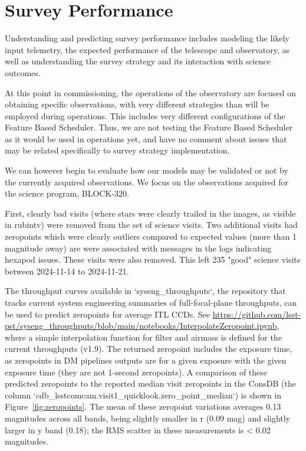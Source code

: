 \section{Survey Performance}
\label{sec:survey_performance}

Understanding and predicting survey performance includes modeling the likely input telemetry, the expected performance of the telescope and observatory, as well as understanding the survey strategy and its interaction with science outcomes. 

At this point in commissioning, the operations of the observatory are focused on obtaining specific observations, with very different strategies than will be employed during operations. This includes very different configurations of the Feature Based Scheduler. Thus, we are not testing the Feature Based Scheduler as it would be used in operations yet, and have no comment about issues that may be related specifically to survey strategy implementation. 

We can however begin to evaluate how our models may be validated or not by the currently acquired observations. We focus on the observations acquired for the science program, BLOCK-320.

First, clearly bad visits (where stars were clearly trailed in the images, as visible in rubintv) were removed from the set of science visits. Two additional visits had zeropoints which were clearly outliers compared to expected values (more than 1 magnitude away) are were associated with messages in the logs indicating hexapod issues. These visits were also removed. This left 235 "good" science visits between 2024-11-14 to 2024-11-21. 

The throughput curves available in `syseng\_throughputs`, the repository that tracks current system engineering summaries of full-focal-plane throughputs, can be used to predict zeropoints for average ITL CCDs. See \url{https://github.com/lsst-pst/syseng\_throughputs/blob/main/notebooks/InterpolateZeropoint.ipynb}, where a simple interpolation function for filter and airmass is defined for the current throughputs (v1.9). The returned zeropoint includes the exposure time, as zeropoints in DM pipelines outputs are for a given exposure with the given exposure time (they are not 1-second zeropoints). A comparison of these predicted zeropoints to the reported median visit zeropoints in the ConsDB (the column `cdb\_lsstcomcam.visit1\_quicklook.zero\_point\_median`) is shown in Figure~\ref{fig:zeropoints}. The mean of these zeropoint variations averages 0.13 magnitudes across all bands, being slightly smaller in r (0.09 mag) and slightly larger in y band (0.18); the RMS scatter in these measurements is < 0.02 magnitudes. 

